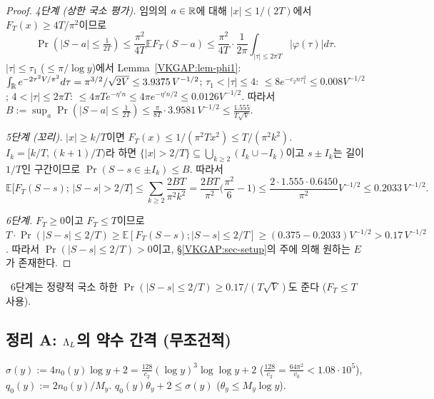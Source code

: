 \begin{proof}
\emph{4단계 (상한 국소 평가).} 임의의 $a\in\mathbb{R}$에 대해 $|x|\le1/(2T)$에서 $F_T(x)\ge4T/\pi^2$이므로
\[
\Pr(|S-a|\le\tfrac1{2T})\le\frac{\pi^2}{4T}\mathbb{E}F_T(S-a)\le\frac{\pi^2}{4T}\cdot\frac1{2\pi}\int_{|\tau|\le2\pi T}|\varphi(\tau)|d\tau .
\]
$|\tau|\le\tau_1$ ($\le\pi/\log y$)에서 Lemma~\ref{VKGAP:lem-phi1}: $\int_{\mathbb{R}} e^{-2\tau^2V/\pi^2}d\tau=\pi^{3/2}/\sqrt{2V}\le3.9375\,V^{-1/2}$;
$\tau_1<|\tau|\le4$: $\le8e^{-c_2n\tau_1^2}\le0.008V^{-1/2}$; $4<|\tau|\le2\pi T$: $\le4\pi Te^{-\eta'n}\le4\pi e^{-\eta'n/2}\le0.0126V^{-1/2}$.
따라서 $B:=\sup_a\Pr(|S-a|\le\frac1{2T})\le\frac{\pi}{8T}\cdot3.9581\,V^{-1/2}\le\frac{1.555}{T\sqrt V}$.

\emph{5단계 (꼬리).} $|x|\ge k/T$이면 $F_T(x)\le1/(\pi^2Tx^2)\le T/(\pi^2k^2)$. $I_k=[k/T,(k+1)/T)$라 하면
$\{|x|>2/T\}\subseteq\bigcup_{k\ge2}(I_k\cup-I_k)$이고 $s\pm I_k$는 길이 $1/T$인 구간이므로 $\Pr(S-s\in\pm I_k)\le B$. 따라서
\[
\mathbb{E}\big[F_T(S-s);\,|S-s|>2/T\big]\le\sum_{k\ge2}\frac{2BT}{\pi^2k^2}=\frac{2BT}{\pi^2}\Big(\frac{\pi^2}6-1\Big)\le\frac{2\cdot1.555\cdot0.6450}{\pi^2}V^{-1/2}\le0.2033\,V^{-1/2}.
\]

\emph{6단계.} $F_T\ge0$이고 $F_T\le T$이므로
$T\cdot\Pr(|S-s|\le2/T)\ge\mathbb{E}[F_T(S-s);|S-s|\le2/T]\ge(0.375-0.2033)V^{-1/2}>0.17\,V^{-1/2}$.
따라서 $\Pr(|S-s|\le2/T)>0$이고, \S\ref{VKGAP:sec-setup}의 주에 의해 원하는 $E$가 존재한다.
\end{proof}

\begin{remark}\label{VKGAP:rem-core-quant}
\PROVED\ 6단계는 정량적 국소 하한 $\Pr(|S-s|\le 2/T)\ge 0.17/(T\sqrt V)$도 준다 ($F_T\le T$ 사용).
\end{remark}

\subsection{정리 A: $\Lambda_L$의 약수 간격 (무조건적)}
\label{VKGAP:sec-A}

$\sigma(y):=4n_0(y)\log y+2=\frac{128}{c_2}(\log y)^3\log\log y+2$ ($\frac{128}{c_2}=\frac{64\pi^2}{v_0}<1.08\cdot10^5$),
$q_0(y):=2n_0(y)/M_y$. $q_0(y)\theta_y+2\le\sigma(y)$ ($\theta_y\le M_y\log y$).

